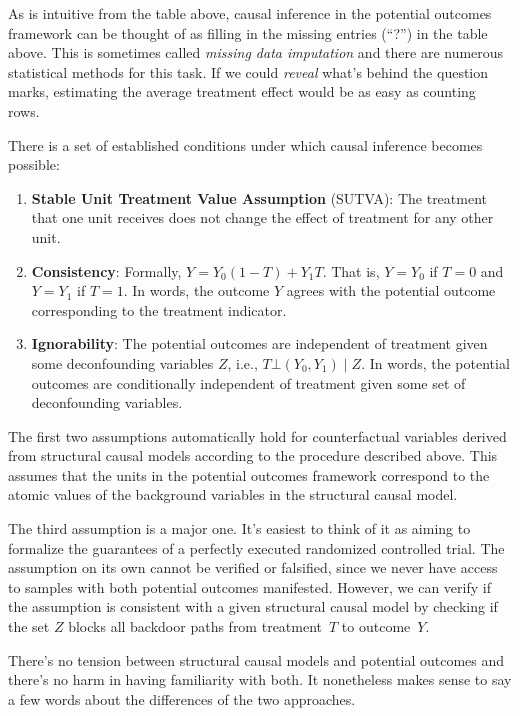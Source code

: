 \documentclass{tufte-book}
\begin{document}
As is intuitive from the table above, causal inference in the potential
outcomes framework can be thought of as filling in the missing entries
(``?'') in the table above. This is sometimes called \emph{missing data
imputation} and there are numerous statistical methods for this task. If
we could \emph{reveal} what's behind the question marks, estimating the
average treatment effect would be as easy as counting rows.

There is a set of established conditions under which causal inference
becomes possible:

\begin{enumerate}
\def\labelenumi{\arabic{enumi}.}
\tightlist
\item
  \textbf{Stable Unit Treatment Value Assumption} (SUTVA): The treatment
  that one unit receives does not change the effect of treatment for any
  other unit.
\item
  \textbf{Consistency}: Formally, \(Y=Y_0(1-T)+Y_1T.\) That is,
  \(Y=Y_0\) if \(T=0\) and \(Y=Y_1\) if \(T=1\). In words, the outcome
  \(Y\) agrees with the potential outcome corresponding to the treatment
  indicator.
\item
  \textbf{Ignorability}: The potential outcomes are independent of
  treatment given some deconfounding variables \(Z\), i.e.,
  \(T\bot (Y_0, Y_1)\mid Z\). In words, the potential outcomes are
  conditionally independent of treatment given some set of deconfounding
  variables.
\end{enumerate}

The first two assumptions automatically hold for counterfactual
variables derived from structural causal models according to the
procedure described above. This assumes that the units in the potential
outcomes framework correspond to the atomic values of the background
variables in the structural causal model.

The third assumption is a major one. It's easiest to think of it as
aiming to formalize the guarantees of a perfectly executed randomized
controlled trial. The assumption on its own cannot be verified or
falsified, since we never have access to samples with both potential
outcomes manifested. However, we can verify if the assumption is
consistent with a given structural causal model by checking if the set
\(Z\) blocks all backdoor paths from treatment~\(T\) to outcome~\(Y\).

There's no tension between structural causal models and potential
outcomes and there's no harm in having familiarity with both. It
nonetheless makes sense to say a few words about the differences of the
two approaches.
\end{document}
